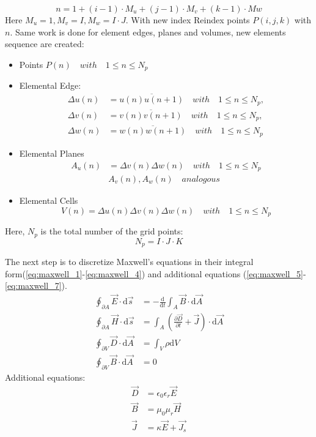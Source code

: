 \begin{equation}
n=1+(i-1)\cdot M_{u}+(j-1)\cdot M_{v}+(k-1)\cdot M{w}
\label{eq:discrete_index}
\end{equation}
Here $M_{u}=1,M_{v}=I,M_{w}=I\cdot J$. With new index
Reindex points $P(i,j,k)$ with $n$. Same work is done for element edges, planes and volumes, new elements sequence are created:
\begin{itemize}
\item Points $P(n) \quad with \quad 1\leq n \leq N_{p}$
\item Elemental Edge:
    \begin{align}
		\Delta u(n)&=\overline{u(n)u(n+1)}  \quad with \quad 1\leq n \leq N_{p}, \nonumber\\
		\Delta v(n)&=\overline{v(n)v(n+1)}  \quad with \quad 1\leq n \leq N_{p}, \nonumber\\
		\Delta w(n)&=\overline{w(n)w(n+1)}  \quad with \quad 1\leq n \leq N_{p}
		\label{eq:discrete_edge_n}
		\end{align}
\item Elemental Planes
		\begin{align}
		A_{u}(n)&=\Delta v(n)\Delta w(n) \quad with \quad 1\leq n\leq N_{p}\nonumber\\
		&A_{v}(n),A_{w}(n)  \quad analogous
		\label{eq:discrete_plane_n}
		\end{align}
\item Elemental Cells
		\begin{equation}
		V(n)=\Delta u(n)\Delta v(n)\Delta w(n)  \quad with \quad 1\leq n\leq N_{p}
		\label{eq:discrete_cell_n}
		\end{equation}
\end{itemize}
Here, $N_{p}$ is the total number of the grid points:
\begin{equation}
N_{p}=I\cdot J\cdot K
\label{eq:np}
\end{equation}

The next step is to discretize Maxwell's equations in their integral form(\ref{eq:maxwell_1}-\ref{eq:maxwell_4}) and additional equations (\ref{eq:maxwell_5}-\ref{eq:maxwell_7}).
\begin{align}
\oint_{\partial A}\vec{E}\cdot\mathrm{d}\vec{s}&=
-\frac{\mathrm{d}}{\mathrm{d}t}\int_{A}\vec{B}\cdot\mathrm{d}\vec{A}
\label{eq:maxwell_1}\\
\oint_{\partial A}\vec{H}\cdot\mathrm{d}\vec{s}&=
\int_{A}(\frac{\partial\vec{D}}{\partial t}+\vec{J})\cdot\mathrm{d}\vec{A}
\label{eq:maxwell_2}\\
\oint_{\partial V}\vec{D}\cdot\mathrm{d}\vec{A}&=
\int_{V}\rho\mathrm{d}V
\label{eq:maxwell_3}\\
\oint_{\partial V}\vec{B}\cdot\mathrm{d}\vec{A}&=0
\label{eq:maxwell_4}
\end{align}
Additional equations:
\begin{align}
\vec{D}&=\epsilon_{0}\epsilon_{r}\vec{E}
\label{eq:maxwell_5}\\
\vec{B}&=\mu_{0}\mu_{r}\vec{H}
\label{eq:maxwell_6}\\
\vec{J}&=\kappa\vec{E}+\vec{J_{s}}
\label{eq:maxwell_7}
\end{align}
